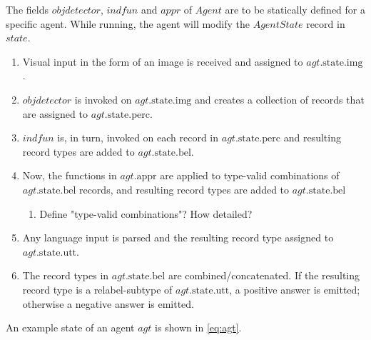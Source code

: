 \documentclass[11pt, a4paper]{article}
\begin{document}
The fields $objdetector$, $indfun$ and $appr$ of $Agent$ are to be statically defined for a specific agent.
While running, the agent will modify the $AgentState$ record in $state$.

\begin{enumerate}
\item Visual input in the form of an image is received and assigned to $agt.\text{state}.\text{img}$.
\item $objdetector$ is invoked on $agt.\text{state.img}$ and creates a collection of records that are assigned to $agt.\text{state}.\text{perc}$.
\item $indfun$ is, in turn, invoked on each record in $agt.\text{state.perc}$ and resulting record types are added to $agt.\text{state.bel}$.
\item Now, the functions in $agt.\text{appr}$ are applied to type-valid combinations of $agt.\text{state.bel}$ records, and resulting record types are added to $agt.\text{state.bel}$
	\begin{enumerate}
	\item Define "type-valid combinations"? How detailed?
	\end{enumerate}
\item Any language input is parsed and the resulting record type assigned to $agt.\text{state.utt}$.
\item The record types in $agt.\text{state.bel}$ are combined/concatenated. If the resulting record type is a relabel-subtype of $agt.\text{state.utt}$, a positive answer is emitted; otherwise a negative answer is emitted.
\end{enumerate}

An example state of an agent $agt$ is shown in \autoref{eq:agt}.
\end{document}
